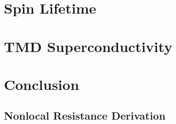 \documentclass[oneside,12pt]{memoir}
\begin{document}
  \frontmatter{}
  
  
  
  \pagestyle{thesis}
  
  
  
  \newpage
  \tableofcontents
  \newpage
  \listoffigures
  \mainmatter{}
  

  \chapter{Spin Lifetime}
  
  
  
  

  \chapter{TMD Superconductivity}
  
  
  
  
  

  \chapter{Conclusion}
  

  \begin{appendices}
    \chapter{Nonlocal Resistance Derivation}
    
  \end{appendices}
  \backmatter{}
  \SingleSpacing{}
  \printbibliography{}
\end{document}
